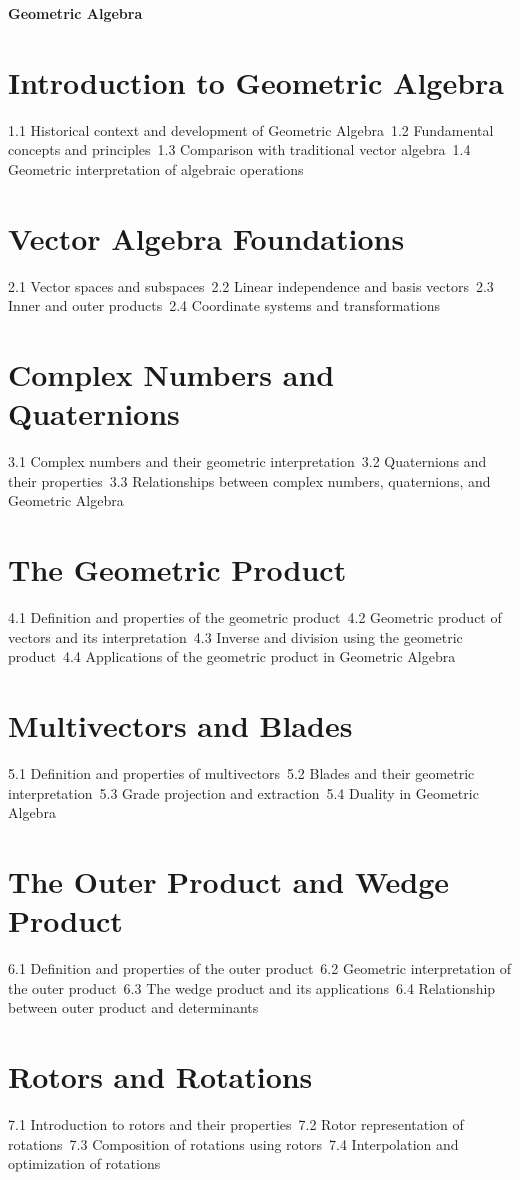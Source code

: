 {\LARGE \bf{Geometric Algebra}}
\section{Introduction to Geometric Algebra}
1.1 Historical context and development of Geometric Algebra\
1.2 Fundamental concepts and principles\
1.3 Comparison with traditional vector algebra\
1.4 Geometric interpretation of algebraic operations\
\section{Vector Algebra Foundations}
2.1 Vector spaces and subspaces\
2.2 Linear independence and basis vectors\
2.3 Inner and outer products\
2.4 Coordinate systems and transformations\
\section{Complex Numbers and Quaternions}
3.1 Complex numbers and their geometric interpretation\
3.2 Quaternions and their properties\
3.3 Relationships between complex numbers, quaternions, and Geometric Algebra\
\section{The Geometric Product}
4.1 Definition and properties of the geometric product\
4.2 Geometric product of vectors and its interpretation\
4.3 Inverse and division using the geometric product\
4.4 Applications of the geometric product in Geometric Algebra\
\section{Multivectors and Blades}
5.1 Definition and properties of multivectors\
5.2 Blades and their geometric interpretation\
5.3 Grade projection and extraction\
5.4 Duality in Geometric Algebra\
\section{The Outer Product and Wedge Product}
6.1 Definition and properties of the outer product\
6.2 Geometric interpretation of the outer product\
6.3 The wedge product and its applications\
6.4 Relationship between outer product and determinants\
\section{Rotors and Rotations}
7.1 Introduction to rotors and their properties\
7.2 Rotor representation of rotations\
7.3 Composition of rotations using rotors\
7.4 Interpolation and optimization of rotations\
